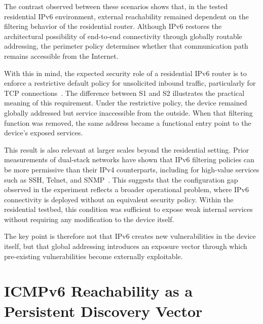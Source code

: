 The contrast observed between these scenarios shows that, in the tested residential IPv6 environment, external reachability remained dependent on the filtering behavior of the residential router. Although IPv6 restores the architectural possibility of end-to-end connectivity through globally routable addressing, the perimeter policy determines whether that communication path remains accessible from the Internet.

With this in mind, the expected security role of a residential IPv6 router is to enforce a restrictive default policy for unsolicited inbound traffic, particularly for TCP connections~\cite{rye2025firewalls}. The difference between S1 and S2 illustrates the practical meaning of this requirement. Under the restrictive policy, the device remained globally addressed but service inaccessible from the outside. When that filtering function was removed, the same address became a functional entry point to the device’s exposed services. 

This result is also relevant at larger scales beyond the residential setting. Prior measurements of dual-stack networks have shown that IPv6 filtering policies can be more permissive than their IPv4 counterparts, including for high-value services such as SSH, Telnet, and SNMP~\cite{czyz2016backdoor}. This suggests that the configuration gap observed in the experiment reflects a broader operational problem, where IPv6 connectivity is deployed without an equivalent security policy. Within the residential testbed, this condition was sufficient to expose weak internal services without requiring any modification to the device itself.

The key point is therefore not that IPv6 creates new vulnerabilities in the device itself, but that global addressing introduces an exposure vector through which pre-existing vulnerabilities become externally exploitable.

\section{ICMPv6 Reachability as a Persistent Discovery Vector}\label{sec:icmp-reachability}


